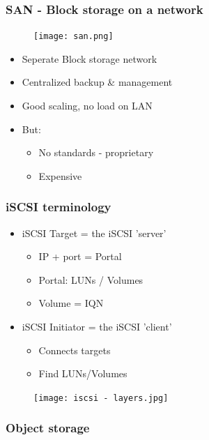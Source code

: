 \documentclass{article}
\begin{document}
\subsubsection{SAN - Block storage on a network}

\begin{figure}[H]
    \centering
    \texttt{[image: san.png]}
    \caption{}
\end{figure}

\begin{itemize}
    \item Seperate Block storage network
    \item Centralized backup \& management
    \item Good scaling, no load on LAN
    \item But:
    \begin{itemize}
        \item No standards - proprietary
        \item Expensive
    \end{itemize}
\end{itemize}

\subsubsection{iSCSI terminology}

\begin{itemize}
    \item iSCSI Target = the iSCSI 'server'
    \begin{itemize}
        \item IP + port = Portal
        \item Portal: LUNs / Volumes
        \item Volume = IQN 
    \end{itemize}
    \item iSCSI Initiator = the iSCSI 'client'
    \begin{itemize}
        \item Connects targets
        \item Find LUNs/Volumes
    \end{itemize}
\end{itemize}

\begin{figure}[H]
    \centering
    \texttt{[image: iscsi - layers.jpg]}
    \caption{}
\end{figure}

\subsubsection{Object storage}
\end{document}
